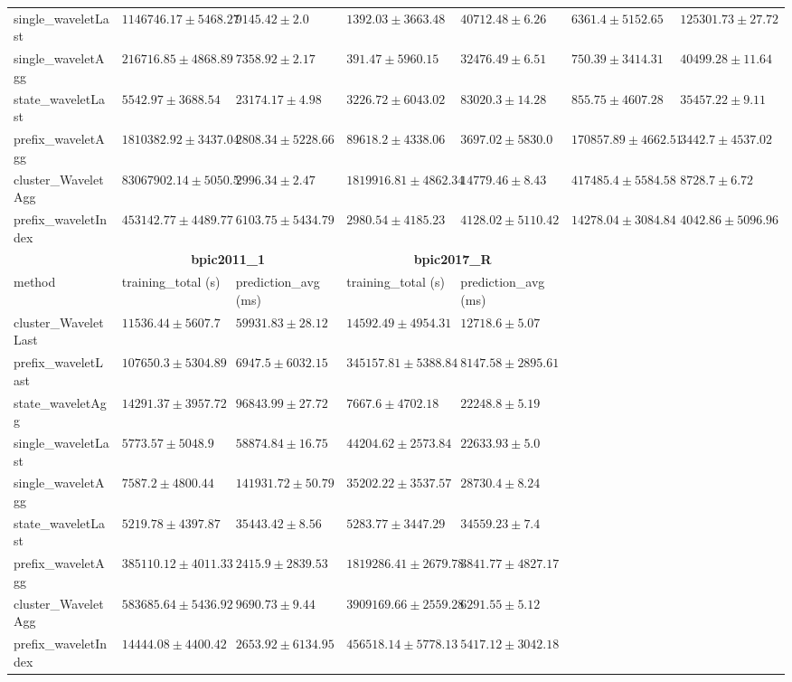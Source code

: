 \documentclass[twoside,11pt]{Latex/Classes/PhDthesisPSnPDF}
\begin{document}
\begin{table}[h]
{\begin{tabular}{llllllll}
		single\_waveletLast & $1146746.17 \pm 5468.27$ & $9145.42 \pm 2.0$ & $1392.03 \pm 3663.48$ & $40712.48 \pm 6.26$ & $6361.4 \pm 5152.65$ & $125301.73 \pm 27.72$ \\ 
		single\_waveletAgg & $216716.85 \pm 4868.89$ & $7358.92 \pm 2.17$ & $\mathbf{391.47 \pm 5960.15}$ & $32476.49 \pm 6.51$ & $\mathbf{750.39 \pm 3414.31}$ & $40499.28 \pm 11.64$ \\ 
		state\_waveletLast & $5542.97 \pm 3688.54$ & $23174.17 \pm 4.98$ & $3226.72 \pm 6043.02$ & $83020.3 \pm 14.28$ & $855.75 \pm 4607.28$ & $35457.22 \pm 9.11$ \\ 
		prefix\_waveletAgg & $1810382.92 \pm 3437.04$ & $\mathbf{2808.34 \pm 5228.66}$ & $89618.2 \pm 4338.06$ & $\mathbf{3697.02 \pm 5830.0}$ & $170857.89 \pm 4662.51$ & $\mathbf{3442.7 \pm 4537.02}$ \\ 
		cluster\_WaveletAgg & $83067902.14 \pm 5050.5$ & $2996.34 \pm 2.47$ & $1819916.81 \pm 4862.34$ & $14779.46 \pm 8.43$ & $417485.4 \pm 5584.58$ & $8728.7 \pm 6.72$ \\ 
		prefix\_waveletIndex & $453142.77 \pm 4489.77$ & $6103.75 \pm 5434.79$ & $2980.54 \pm 4185.23$ & $4128.02 \pm 5110.42$ & $14278.04 \pm 3084.84$ & $4042.86 \pm 5096.96$ \\ 
		\bottomrule
		\toprule
		& \multicolumn{2}{c}{{\bfseries bpic2011\_1}} & \multicolumn{2}{c}{{\bfseries bpic2017\_R}} \\ \cmidrule(lr){2-3} \cmidrule(lr){4-5} \cmidrule(lr){6-7}
		method  & training\_total (s) & prediction\_avg (ms) & training\_total (s) & prediction\_avg (ms) \\ \midrule
		cluster\_WaveletLast & $11536.44 \pm 5607.7$ & $59931.83 \pm 28.12$ & $14592.49 \pm 4954.31$ & $12718.6 \pm 5.07$ \\ 
		prefix\_waveletLast & $107650.3 \pm 5304.89$ & $6947.5 \pm 6032.15$ & $345157.81 \pm 5388.84$ & $8147.58 \pm 2895.61$ \\ 
		state\_waveletAgg & $14291.37 \pm 3957.72$ & $96843.99 \pm 27.72$ & $7667.6 \pm 4702.18$ & $22248.8 \pm 5.19$ \\ 
		single\_waveletLast & $5773.57 \pm 5048.9$ & $58874.84 \pm 16.75$ & $44204.62 \pm 2573.84$ & $22633.93 \pm 5.0$ \\ 
		single\_waveletAgg & $7587.2 \pm 4800.44$ & $141931.72 \pm 50.79$ & $35202.22 \pm 3537.57$ & $28730.4 \pm 8.24$ \\ 
		state\_waveletLast & $\mathbf{5219.78 \pm 4397.87}$ & $35443.42 \pm 8.56$ & $\mathbf{5283.77 \pm 3447.29}$ & $34559.23 \pm 7.4$ \\ 
		prefix\_waveletAgg & $385110.12 \pm 4011.33$ & $\mathbf{2415.9 \pm 2839.53}$ & $1819286.41 \pm 2679.78$ & $\mathbf{3841.77 \pm 4827.17}$ \\ 
		cluster\_WaveletAgg & $583685.64 \pm 5436.92$ & $9690.73 \pm 9.44$ & $3909169.66 \pm 2559.28$ & $6291.55 \pm 5.12$ \\ 
		prefix\_waveletIndex & $14444.08 \pm 4400.42$ & $2653.92 \pm 6134.95$ & $456518.14 \pm 5778.13$ & $5417.12 \pm 3042.18$ \\ 
		\bottomrule
			
		\end{tabular}%
	}	
\end{table}
\end{document}
